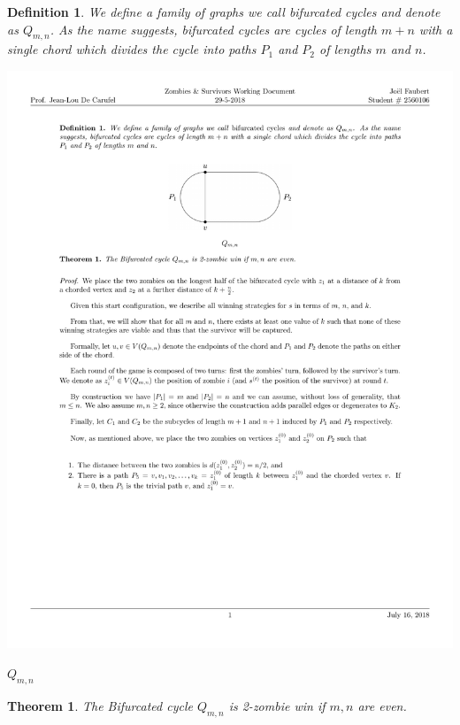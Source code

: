\documentclass[letterpaper, 10pt]{article}
\begin{document}
\newtheorem{definition}{Definition}
\newtheorem{theorem}{Theorem}
\newtheorem{proposition}{Proposition}
\newtheorem{corollary}{Corollary}
\newtheorem{lemma}{Lemma}

\begin{definition}
 We define a family of graphs we call \emph{bifurcated cycles} and denote as $Q_{m,n}$.
 As the name suggests, bifurcated cycles are cycles of length $m+n$ with a single chord
 which divides the cycle into paths $P_1$ and $P_2$ of lengths $m$ and $n$.
\end{definition}

\begin{center}
 \includegraphics[scale=0.20]{Q_m_n}

 $Q_{m,n}$
\end{center}

\begin{theorem}
The Bifurcated cycle $Q_{m,n}$ is 2-zombie win if $m, n$ are even.
\end{theorem}
\end{document}
